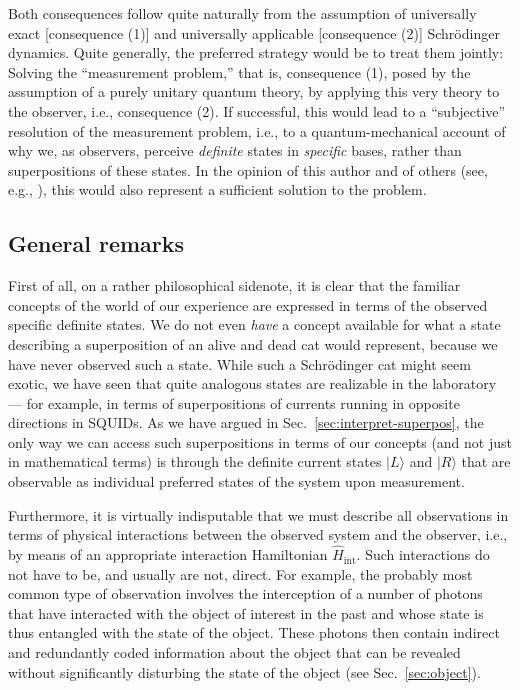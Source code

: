 \documentclass[12pt,aps,floatfix,amsmath,amssymb,showpacs,nofootinbib]{revtex4-2}
\newcommand{\ket}[1]{\ensuremath{|{#1\rangle}}}
\begin{document}
Both consequences follow quite naturally from the assumption of
universally exact [consequence (1)] and universally applicable
[consequence (2)] Schr\"odinger dynamics.  Quite generally, the
preferred strategy would be to treat them jointly: Solving the
``measurement problem,'' that is, consequence (1), posed by the
assumption of a purely unitary quantum theory, by applying this very
theory to the observer, i.e., consequence (2). If successful, this
would lead to a ``subjective'' resolution of the measurement problem,
i.e., to a quantum-mechanical account of why we, as observers,
perceive {\it definite} states in {\it specific} bases, rather than
superpositions of these states.  In the opinion of this author
\cite{Schlosshauer:2003:tv} and of others (see, e.g.,
\cite{Zeh:1973:wq,Zurek:1998:re,Espagnat:2000:uy,Zeh:2000:rr,Zurek:2002:ii}),
this would also represent a sufficient solution to the problem.


\subsection{General remarks}

First of all, on a rather philosophical sidenote, it is clear that the
familiar concepts of the world of our experience are expressed in
terms of the observed specific definite states.  We do not even {\it
  have} a concept available for what a state describing a
superposition of an alive and dead cat would represent, because we
have never observed such a state. While such a Schr\"odinger cat might
seem exotic, we have seen that quite analogous states are realizable
in the laboratory --- for example, in terms of superpositions of
currents running in opposite directions in SQUIDs.  As we have argued
in Sec.~\ref{sec:interpret-superpos}, the only way we can access such
superpositions in terms of our concepts (and not just in mathematical
terms) is through the definite current states $\ket{L}$ and $\ket{R}$
that are observable as individual preferred states of the system upon
measurement.

Furthermore, it is virtually indisputable that we must describe all
observations in terms of physical interactions between the observed
system and the observer, i.e., by means of an appropriate interaction
Hamiltonian $\widehat{H}_\text{int}$.  Such interactions do not have
to be, and usually are not, direct. For example, the probably most
common type of observation involves the interception of a number of
photons that have interacted with the object of interest in the past
and whose state is thus entangled with the state of the object.  These
photons then contain indirect and redundantly coded information about
the object that can be revealed without significantly disturbing the
state of the object (see Sec.~\ref{sec:object}).
\end{document}
